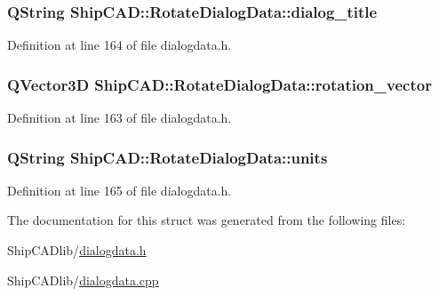\subsubsection[{\texorpdfstring{dialog\+\_\+title}{dialog_title}}]{\setlength{\rightskip}{0pt plus 5cm}Q\+String Ship\+C\+A\+D\+::\+Rotate\+Dialog\+Data\+::dialog\+\_\+title}\hypertarget{structShipCAD_1_1RotateDialogData_af8648790d9c834ad4c65e3a188290738}{}\label{structShipCAD_1_1RotateDialogData_af8648790d9c834ad4c65e3a188290738}


Definition at line 164 of file dialogdata.\+h.

\subsubsection[{\texorpdfstring{rotation\+\_\+vector}{rotation_vector}}]{\setlength{\rightskip}{0pt plus 5cm}Q\+Vector3D Ship\+C\+A\+D\+::\+Rotate\+Dialog\+Data\+::rotation\+\_\+vector}\hypertarget{structShipCAD_1_1RotateDialogData_a53bd3533c7fd9e82d9298cbba080a430}{}\label{structShipCAD_1_1RotateDialogData_a53bd3533c7fd9e82d9298cbba080a430}


Definition at line 163 of file dialogdata.\+h.

\subsubsection[{\texorpdfstring{units}{units}}]{\setlength{\rightskip}{0pt plus 5cm}Q\+String Ship\+C\+A\+D\+::\+Rotate\+Dialog\+Data\+::units}\hypertarget{structShipCAD_1_1RotateDialogData_a893de613d61c0c377dbbd1cee8cb6c19}{}\label{structShipCAD_1_1RotateDialogData_a893de613d61c0c377dbbd1cee8cb6c19}


Definition at line 165 of file dialogdata.\+h.



The documentation for this struct was generated from the following files\+:\begin{DoxyCompactItemize}
\item 
Ship\+C\+A\+Dlib/\hyperlink{dialogdata_8h}{dialogdata.\+h}\item 
Ship\+C\+A\+Dlib/\hyperlink{dialogdata_8cpp}{dialogdata.\+cpp}\end{DoxyCompactItemize}
